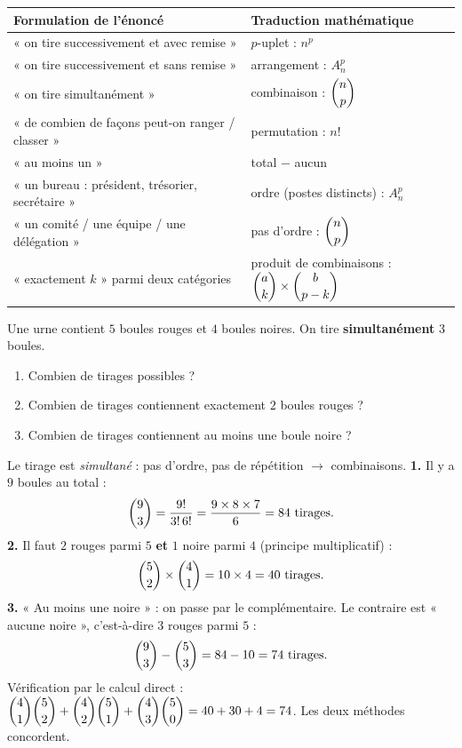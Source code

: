 \documentclass[11pt]{article}
\begin{document}
\begin{center}
\small
\begin{tabularx}{\linewidth}{|X|X|}
\hline
\rowcolor{popblueL} \textbf{Formulation de l'énoncé} & \textbf{Traduction mathématique} \\
\hline
« on tire successivement et avec remise » & $p$-uplet : $n^p$ \\
\hline
« on tire successivement et sans remise » & arrangement : $A_n^p$ \\
\hline
« on tire simultanément » & combinaison : $\dbinom{n}{p}$ \\
\hline
« de combien de façons peut-on ranger / classer » & permutation : $n!$ \\
\hline
« au moins un » & total $-$ aucun \\
\hline
« un bureau : président, trésorier, secrétaire » & ordre (postes distincts) : $A_n^p$ \\
\hline
« un comité / une équipe / une délégation » & pas d'ordre : $\dbinom{n}{p}$ \\
\hline
« exactement $k$ » parmi deux catégories & produit de combinaisons : $\dbinom{a}{k} \times \dbinom{b}{p-k}$ \\
\hline
\end{tabularx}
\end{center}

\begin{exoresolu}
Une urne contient $5$ boules rouges et $4$ boules noires. On tire \textbf{simultanément} $3$ boules.
\begin{enumerate}
\item Combien de tirages possibles ?
\item Combien de tirages contiennent exactement $2$ boules rouges ?
\item Combien de tirages contiennent au moins une boule noire ?
\end{enumerate}
\tcblower
Le tirage est \emph{simultané} : pas d'ordre, pas de répétition $\rightarrow$ combinaisons.
\textbf{1.} Il y a $9$ boules au total :
\[ \dbinom{9}{3} = \frac{9!}{3!\,6!} = \frac{9 \times 8 \times 7}{6} = 84 \text{ tirages.} \]
\textbf{2.} Il faut $2$ rouges parmi $5$ \textbf{et} $1$ noire parmi $4$ (principe multiplicatif) :
\[ \dbinom{5}{2} \times \dbinom{4}{1} = 10 \times 4 = 40 \text{ tirages.} \]
\textbf{3.} « Au moins une noire » : on passe par le complémentaire. Le contraire est « aucune noire », c'est-à-dire $3$ rouges parmi $5$ :
\[ \dbinom{9}{3} - \dbinom{5}{3} = 84 - 10 = 74 \text{ tirages.} \]
Vérification par le calcul direct : $\dbinom{4}{1}\dbinom{5}{2} + \dbinom{4}{2}\dbinom{5}{1} + \dbinom{4}{3}\dbinom{5}{0} = 40 + 30 + 4 = 74$. Les deux méthodes concordent.
\end{exoresolu}
\end{document}
